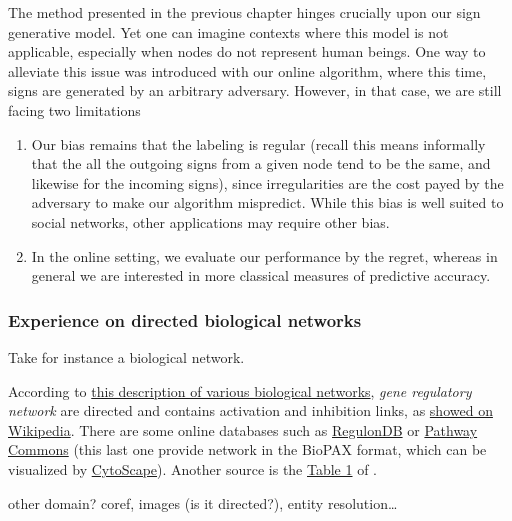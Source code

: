 The method presented in the previous chapter hinges crucially upon our sign generative model. Yet
one can imagine contexts where this model is not applicable, especially when nodes do not represent
human beings. One way to alleviate this issue was introduced with our online algorithm, where this
time, signs are generated by an arbitrary adversary. However, in that case, we are still facing two
limitations
\begin{enumerate}
	\item Our bias remains that the labeling is regular (recall this means informally that the all
		the outgoing signs from a given node tend to be the same, and likewise for the incoming signs),
		since irregularities are the cost payed by the adversary to make our algorithm mispredict. While
		this bias is well suited to social networks, other applications may require other
		bias.
	\item In the online setting, we evaluate our performance by the regret,
		whereas in general we are interested in more classical measures of predictive accuracy.
\end{enumerate}

\subsubsection{Experience on directed biological networks}
\label{ssub:experience_on_directed_biological_networks}

Take for instance a biological network.

According to \href{https://web.stanford.edu/class/cs224w/slides/handout-bionets.pdf}%
{this description of various biological networks}, \emph{gene regulatory network} are directed and
contains activation and inhibition links, as \href{https://en.wikipedia.org/wiki/Gene_regulatory_network#Overview}%
{showed on Wikipedia}. There are some online databases such as
\href{http://regulondb.ccg.unam.mx/menu/download/datasets/index.jsp}%
{RegulonDB} or \href{http://www.pathwaycommons.org/pcviz/}{Pathway Commons} (this last one provide
network in the BioPAX format, which can be visualized by
\href{http://www.cytoscape.org/}{CytoScape}).
Another source is the \href{https://www.ncbi.nlm.nih.gov/pmc/articles/PMC2708159/table/T1}{Table 1}
of \cite{BioSigned09}.

other domain? coref, images (is it directed?), entity resolution…
